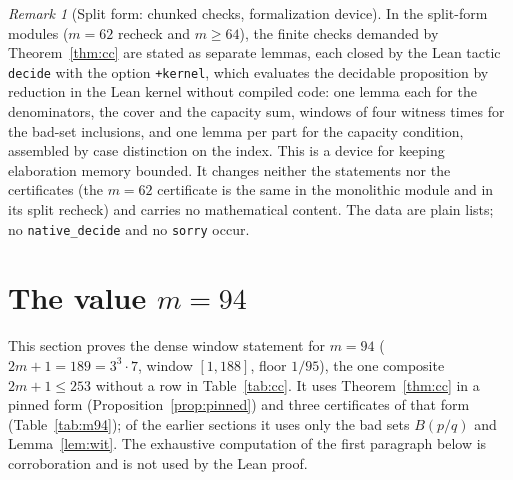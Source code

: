 \documentclass[11pt]{article}
\theoremstyle{remark}
\newtheorem{remark}[theorem]{Remark}
\begin{document}
\begin{remark}[Split form: chunked checks, formalization device]\label{rem:split}
In the split-form modules ($m=62$ recheck and $m\ge64$), the finite checks demanded by Theorem~\ref{thm:cc} are stated as separate lemmas, each closed by the Lean tactic \texttt{decide} with the option \texttt{+kernel}, which evaluates the decidable proposition by reduction in the Lean kernel without compiled code: one lemma each for the denominators, the cover and the capacity sum, windows of four witness times for the bad-set inclusions, and one lemma per part for the capacity condition, assembled by case distinction on the index. This is a device for keeping elaboration memory bounded. It changes neither the statements nor the certificates (the $m=62$ certificate is the same in the monolithic module and in its split recheck) and carries no mathematical content. The data are plain lists; no \texttt{native\_decide} and no \texttt{sorry} occur.
\end{remark}

\section{The value $m=94$}\label{sec:m94}

This section proves the dense window statement for $m=94$ ($2m+1=189=3^3\cdot7$, window $[1,188]$, floor $1/95$), the one composite $2m+1\le253$ without a row in Table~\ref{tab:cc}. It uses Theorem~\ref{thm:cc} in a pinned form (Proposition~\ref{prop:pinned}) and three certificates of that form (Table~\ref{tab:m94}); of the earlier sections it uses only the bad sets $B(p/q)$ and Lemma~\ref{lem:wit}. The exhaustive computation of the first paragraph below is corroboration and is not used by the Lean proof.
\end{document}
